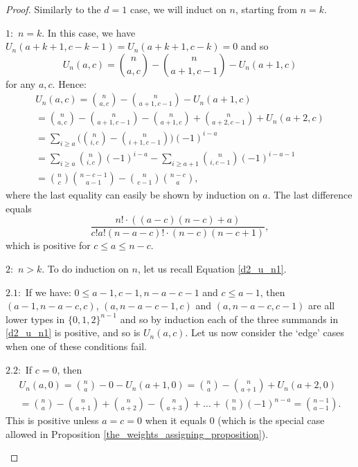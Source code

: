 \documentclass[11pt, reqno]{amsart}
\newenvironment{caseindent}[1][2em]
  {%
    \begin{list}{}{%
      \setlength{\leftmargin}{#1}%
      \setlength{\rightmargin}{0pt}%
      \setlength{\topsep}{0pt}%
      \setlength{\partopsep}{0pt}%
      \setlength{\itemsep}{0pt}%
      \setlength{\parsep}{\parskip}%
      \setlength{\listparindent}{\parindent}%
    }%
    \item[]%
    \let\fullwidthdisplay\relax
    \ignorespaces
  }
  {%
    \end{list}%
    \ignorespacesafterend
  }
\theoremstyle{remark}
\numberwithin{equation}{section}
\begin{document}
\begin{proof}
    Similarly to the $d=1$ case, we will induct on $n$, starting from $n=k$.

    \begin{caseindent}
    $1:$ $n=k$. In this case, we have $U_n(a+k+1, c-k-1) = U_n(a+k+1, c-k)=0$ and so
        \begin{equation*}
            U_n(a, c)=\binom{n}{a, c}-\binom{n}{a+1, c-1} - U_n(a+1, c)
        \end{equation*}
        for any $a, c$. Hence:
        \begin{multline*}
            U_n(a, c) = \binom{n}{a, c}-\binom{n}{a+1, c-1} - U_n(a+1, c)\\
            = \binom{n}{a, c}-\binom{n}{a+1, c-1} - \binom{n}{a+1, c} + \binom{n}{a+2, c-1} + U_n(a+2, c)\\
            = \sum_{i \geqslant a} \Big( \binom{n}{i, c} - \binom{n}{i+1, c-1} \Big) (-1)^{i-a}\\
            = \sum_{i \geqslant a} \binom{n}{i, c} (-1)^{i-a} - \sum_{i \geqslant a+1} \binom{n}{i, c-1} (-1)^{i-a-1} \\
            = \binom{n}{c}\binom{n-c-1}{a-1} - \binom{n}{c-1}\binom{n-c}{a},
        \end{multline*}
        where the last equality can easily be shown by induction on $a$. The last difference equals
        \begin{equation*}
            \frac{n! \cdot ((a-c)(n-c) + a)}{c!a!(n-a-c)! \cdot (n-c)(n-c+1)},
        \end{equation*}
        which is positive for $c \leqslant a \leqslant n-c$.
    
    $2:$ $n>k$. To do induction on $n$, let us recall Equation \ref{d2_u_n1}.
    \begin{caseindent}
        $2.1:$ If we have: $0 \leqslant a-1, c-1, n-a-c-1$ and $c \leqslant a-1$, then $(a-1, n-a-c, c)$, $(a, n-a-c-1, c)$ and $(a, n-a-c, c-1)$ are all lower types in $\{0,1,2\}^{n-1}$ and so by induction each of the three summands in \ref{d2_u_n1} is positive, and so is $U_n(a, c)$. Let us now consider the `edge' cases when one of these conditions fail.
    
        $2.2:$ If $c=0$, then
        \begin{multline*}
            U_n(a, 0) = \binom{n}{a} - 0 - U_n(a+1, 0)=\binom{n}{a}-\binom{n}{a+1}+U_n(a+2, 0)\\
            = \binom{n}{a}-\binom{n}{a+1} + \binom{n}{a+2} - \binom{n}{a+3} + \ldots + \binom{n}{n}(-1)^{n-a}=\binom{n-1}{a-1}.
        \end{multline*}
        This is positive unless $a=c=0$ when it equals $0$ (which is the special case allowed in Proposition \ref{the_weights_assigning_proposition}).
        

\end{caseindent}
\end{caseindent}
\end{proof}
\end{document}
